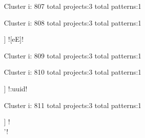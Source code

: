Cluster i: 807
total projects:3
total patterns:1
\begin{multicols}{1}
\end{multicols}







Cluster i: 808
total projects:3
total patterns:1
\begin{multicols}{1}
\begin{description}[noitemsep,topsep=0pt]
\item [[3] ] \cverb![eE]!
\end{description}
\end{multicols}







Cluster i: 809
total projects:3
total patterns:1
\begin{multicols}{1}
\begin{description}[noitemsep,topsep=0pt]
\item [[3] ] \cverb!\(\n!
\end{description}
\end{multicols}







Cluster i: 810
total projects:3
total patterns:1
\begin{multicols}{1}
\begin{description}[noitemsep,topsep=0pt]
\item [[3] ] \cverb!:uuid!
\end{description}
\end{multicols}







Cluster i: 811
total projects:3
total patterns:1
\begin{multicols}{1}
\begin{description}[noitemsep,topsep=0pt]
\item [[3] ] \cverb!\\'!
\end{description}
\end{multicols}







